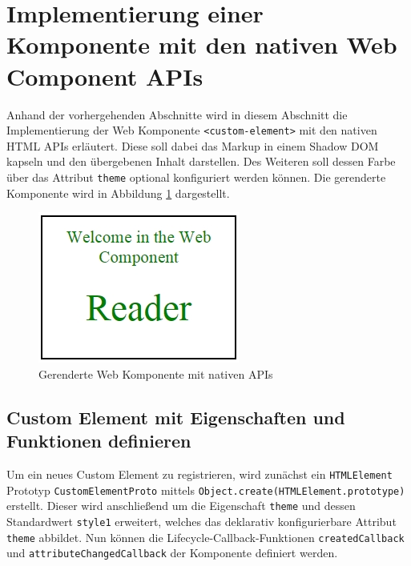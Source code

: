 \section{Implementierung einer Komponente mit den nativen Web Component APIs}\label{implementierung-einer-komponente-mit-den-nativen-web-component-apis}

Anhand der vorhergehenden Abschnitte wird in diesem Abschnitt die Implementierung der Web Komponente \texttt{\textless{}custom-element\textgreater{}} mit den nativen HTML APIs erläutert. Diese soll dabei das Markup in einem Shadow DOM kapseln und den übergebenen Inhalt darstellen. Des Weiteren soll dessen Farbe über das Attribut \texttt{theme} optional konfiguriert werden können. Die gerenderte Komponente wird in Abbildung \ref{fig:gwkmnapis} dargestellt.

\begin{figure}[htbp]
 \centering
 \includegraphics{kapitel2/bilder/7-beispiel}
 \caption{Gerenderte Web Komponente mit nativen APIs}
 \label{fig:gwkmnapis}
\end{figure}


\subsection{Custom Element mit Eigenschaften und Funktionen definieren}\label{custom-element-mit-eigenschaften-und-funktionen-definieren}

Um ein neues Custom Element zu registrieren, wird zunächst ein \texttt{HTMLElement} Prototyp \texttt{CustomElementProto} mittels \texttt{Object.create(HTMLElement.prototype)} erstellt. Dieser wird anschließend um die Eigenschaft \texttt{theme} und dessen Standardwert \texttt{style1} erweitert, welches das deklarativ konfigurierbare
Attribut \texttt{theme} abbildet. Nun können die Lifecycle-Callback-Funktionen \texttt{createdCallback} und \texttt{attributeChangedCallback} der Komponente definiert werden.

